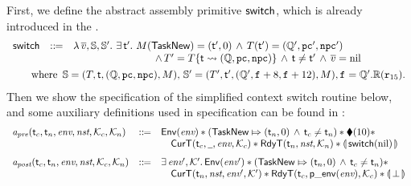 First, we define the abstract assembly primitive $\mathsf{switch}$, which is 
already introduced in the \Sec{\ref{subsec:High-level Pseudo-SPARCv8 Language}}. 
{
    \small
    $$
    \begin{array}{lcl}
        \primsw & \define & 
        \lambda \, \args{\val}, \hpstate, \hpstate'. \ 
        \exists \, \thrdid'. \ 
        \Mem(\TaskNew) = (\thrdid', 0) \, \land \, 
        \thrdpool(\thrdid') = 
            (\hRstate', \pc', \npc') \\ 
        & & \hspace*{8em} \land \, 
        \thrdpool' = \thrdpool\{ \thrdid \rightsquigarrow 
        (\hRstate, \pc, \npc) \}
        \, \land \, \thrdid \neq \thrdid'
        \, \land \, \args{\val} = \nil \\
        \\[-8pt] 
        \multicolumn{3}{l}
        {
        	\hspace*{1.8em}
            \text{where } \, 
            \hpstate = 
                (\thrdpool, \thrdid, (\hRstate, \pc, \npc), \Mem), \, 
            \hpstate' = 
            (\thrdpool', \thrdid', 
            	(\hRstate', \lab{} + 8, \lab{} + 12), \Mem), \lab{} = \hRstate'.\hRfile(\reg{15}). 
        }
    \end{array}
    $$
}
Then we show the specification of the simplified context switch routine below, and some auxiliary 
definitions used in specification can be found in \Fig{\ref{def:aux-def-spec}}: 
{
    \small
    \[
        \begin{array}{lcl}
            \textit{a}_\textit{pre}(\textsf{t}_c, \textsf{t}_n, \textit{env}, \textit{nst}, \mathcal{K}_c, \mathcal{K}_n) 
            & ::\!\!{=} & 
            \mathsf{Env}({\textit{env}}) *
            ({\mathsf{TaskNew}}\Mapsto{(\textsf{t}_n, 0)} \, \land \, \textsf{t}_c \neq \textsf{t}_n) * 
            \blacklozenge({10}) * \\
            & & \quad 
            \textsf{CurT}({\textsf{t}_c}, {\underline{\ \,}}, {\textit{env}}, {\mathcal{K}_c}) * 
            \textsf{RdyT}({\textsf{t}_n}, {\textit{nst}}, {\mathcal{K}_n}) * 
            \llparenthesis {\, \mathsf{switch}(\text{nil}) \,} \rrparenthesis \\
            \\[-5pt]
            \textit{a}_\textit{post}(\textsf{t}_c, \textsf{t}_n, \textit{env}, \textit{nst}, \mathcal{K}_c, \mathcal{K}_n)
            & ::\!\!{=} & \exists \, \textit{env}', \mathcal{K}'. \, \mathsf{Env}({\textit{env}'}) 
            * ({\mathsf{TaskNew}}\Mapsto{(\textsf{t}_n, 0)} \, \land \, \textsf{t}_c \neq \textsf{t}_n) 
            * \\
            & & 
            \quad 
            \textsf{CurT}({\textsf{t}_n}, {\textit{nst}}, {\textit{env}'}, {\mathcal{K}'}) * 
            \textsf{RdyT}({\textsf{t}_c}, {\mathsf{p\_env}({\textit{env}})}, {\mathcal{K}_c}) * 
            \llparenthesis {\, \perp\,} \rrparenthesis  
        \end{array}
    \]
} 

